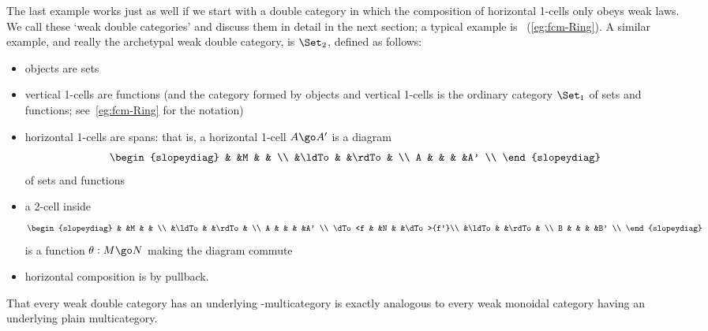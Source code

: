 \begin{example}	
The last example works just as well if we start with a double category in
which the composition of horizontal 1-cells only obeys weak laws.  We call
these `weak%
%
%
%
%
double categories' and discuss them in detail in the next
section; a typical example is ~(\ref{eg:fcm-Ring}).  A similar
example, and really the archetypal weak double category, is $\Set_2$,%
% 
%
%
%
% 
defined as follows:
%
\begin{itemize}
\item objects are sets
\item vertical 1-cells are functions (and the category formed by objects
and vertical 1-cells is the ordinary category $\Set_1$ of sets and
functions; see~\ref{eg:fcm-Ring} for the notation)
\item horizontal 1-cells are spans:%
%
%
that is, a horizontal 1-cell $A \go A'$
is a diagram
\[
\begin{slopeydiag}
	&	&M	&	&	\\
	&\ldTo	&	&\rdTo	&	\\
A	&	&	&	&A'	\\
\end{slopeydiag}
\]
of sets and functions
\item a 2-cell inside
\[
\begin{slopeydiag}
	&	&M	&	&	\\
	&\ldTo	&	&\rdTo	&	\\
A	&	&	&	&A'	\\
\dTo<f	&	&N	&	&\dTo>{f'}\\
	&\ldTo	&	&\rdTo	&	\\
B	&	&	&	&B'	\\
\end{slopeydiag}
\]
is a function $\theta: M \go N$ making the diagram commute
\item horizontal composition is by pullback.
\end{itemize}
%
That every weak double category has an underlying \fc-multicategory is
exactly analogous to every weak monoidal category having an underlying
plain multicategory.
\end{example}

